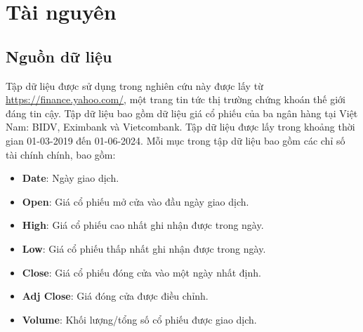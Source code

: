 \section{Tài nguyên}
\subsection{Nguồn dữ liệu}
Tập dữ liệu được sử dụng trong nghiên cứu này được lấy từ \underline{\href{https://finance.yahoo.com/}{https://finance.yahoo.com/}}, một trang tin tức thị trường chứng khoán thế giới đáng tin cậy. Tập dữ liệu bao gồm dữ liệu giá cổ phiếu của ba ngân hàng tại Việt Nam: BIDV, Eximbank và Vietcombank. Tập dữ liệu được lấy trong khoảng thời gian 01-03-2019 đến 01-06-2024. Mỗi mục trong tập dữ liệu bao gồm các chỉ số tài chính chính, bao gồm:
\begin{itemize}
\item \textbf{Date}: Ngày giao dịch.
\item \textbf{Open}: Giá cổ phiếu mở cửa vào đầu ngày giao dịch.
\item \textbf{High}: Giá cổ phiếu cao nhất ghi nhận được trong ngày.
\item \textbf{Low}: Giá cổ phiếu thấp nhất ghi nhận được trong ngày.
\item \textbf{Close}: Giá cổ phiếu đóng cửa vào một ngày nhất định.
\item \textbf{Adj Close}: Giá đóng cửa được điều chỉnh.
\item \textbf{Volume}: Khối lượng/tổng số cổ phiếu được giao dịch.
\end{itemize}
